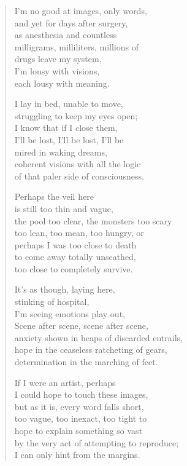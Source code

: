\begin{verse}
I'm no good at images, only words,\\
and yet for days after surgery,\\
as anesthesia and countless\\
\vin milligrams, milliliters, millions of\\
drugs leave my system,\\
I'm lousy with visions,\\
each lousy with meaning.

I lay in bed, unable to move,\\
struggling to keep my eyes open;\\
I know that if I close them,\\
\vin I'll be lost, I'll be lost, I'll be\\
mired in waking dreams,\\
coherent visions with all the logic\\
of that paler side of consciousness.

Perhaps the veil here\\
is still too thin and vague,\\
the pool too clear, the monsters too scary\\
\vin too lean, too mean, too hungry, or\\
perhaps I was too close to death\\
to come away totally unscathed,\\
too close to completely survive.
\newpage

\vin It's as though, laying here,\\
\vin stinking of hospital,\\
\vin I'm seeing emotions play out,\\
\vin \vin Scene after scene, scene after scene,\\
\vin anxiety shown in heaps of discarded entrails,\\
\vin hope in the ceaseless ratcheting of gears,\\
\vin determination in the marching of feet.

If I were an artist, perhaps\\
I could hope to touch these images,\\
but as it is, every word falls short,\\
\vin too vague, too inexact, too tight to\\
hope to explain something so vast\\
by the very act of attempting to reproduce;\\
I can only hint from the margins.


\end{verse}
